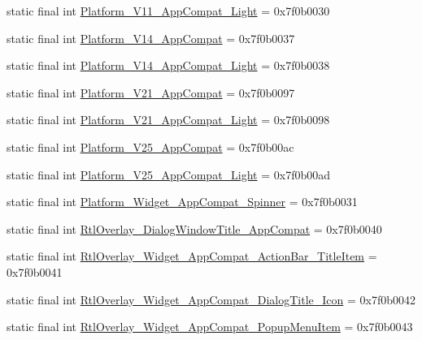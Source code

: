 \begin{CompactItemize}
\item 
static final int \hyperlink{classandroid_1_1support_1_1v7_1_1mediarouter_1_1_r_1_1style_13085e62a87865391b1ef6abe42d7005}{Platform\_\-V11\_\-AppCompat\_\-Light} = 0x7f0b0030
\item 
static final int \hyperlink{classandroid_1_1support_1_1v7_1_1mediarouter_1_1_r_1_1style_6cd9c57cb91bc29c55f010ee6d9fb88a}{Platform\_\-V14\_\-AppCompat} = 0x7f0b0037
\item 
static final int \hyperlink{classandroid_1_1support_1_1v7_1_1mediarouter_1_1_r_1_1style_66a415a2d9a877d46e1551874d36c562}{Platform\_\-V14\_\-AppCompat\_\-Light} = 0x7f0b0038
\item 
static final int \hyperlink{classandroid_1_1support_1_1v7_1_1mediarouter_1_1_r_1_1style_30c7219bb4c03c246d5c23826ee7e556}{Platform\_\-V21\_\-AppCompat} = 0x7f0b0097
\item 
static final int \hyperlink{classandroid_1_1support_1_1v7_1_1mediarouter_1_1_r_1_1style_9914894cf2bdd35b85185e33b8d47020}{Platform\_\-V21\_\-AppCompat\_\-Light} = 0x7f0b0098
\item 
static final int \hyperlink{classandroid_1_1support_1_1v7_1_1mediarouter_1_1_r_1_1style_edea2bf3822a815a78ec5254eb0f502f}{Platform\_\-V25\_\-AppCompat} = 0x7f0b00ac
\item 
static final int \hyperlink{classandroid_1_1support_1_1v7_1_1mediarouter_1_1_r_1_1style_b256a203c404d6be65232adbbe4b99fa}{Platform\_\-V25\_\-AppCompat\_\-Light} = 0x7f0b00ad
\item 
static final int \hyperlink{classandroid_1_1support_1_1v7_1_1mediarouter_1_1_r_1_1style_5351477343d1a5d47b9c0c9595e23c45}{Platform\_\-Widget\_\-AppCompat\_\-Spinner} = 0x7f0b0031
\item 
static final int \hyperlink{classandroid_1_1support_1_1v7_1_1mediarouter_1_1_r_1_1style_e9c8e8be85dcdb0a89e2d2039859a0c3}{RtlOverlay\_\-DialogWindowTitle\_\-AppCompat} = 0x7f0b0040
\item 
static final int \hyperlink{classandroid_1_1support_1_1v7_1_1mediarouter_1_1_r_1_1style_1a1f7d8bf7683132936dc8078d0c9d0a}{RtlOverlay\_\-Widget\_\-AppCompat\_\-ActionBar\_\-TitleItem} = 0x7f0b0041
\item 
static final int \hyperlink{classandroid_1_1support_1_1v7_1_1mediarouter_1_1_r_1_1style_cff61ab991a079c8731ada8cfccfeae2}{RtlOverlay\_\-Widget\_\-AppCompat\_\-DialogTitle\_\-Icon} = 0x7f0b0042
\item 
static final int \hyperlink{classandroid_1_1support_1_1v7_1_1mediarouter_1_1_r_1_1style_3cfecde13b61c27bade46c00102765a0}{RtlOverlay\_\-Widget\_\-AppCompat\_\-PopupMenuItem} = 0x7f0b0043

\end{CompactItemize}
